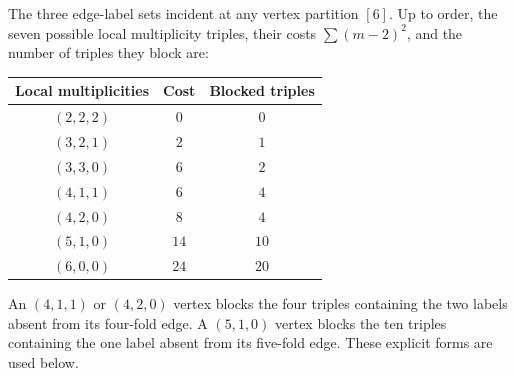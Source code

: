 \documentclass[11pt]{article}
\begin{document}
The three edge-label sets incident at any vertex partition $[6]$. Up to order, the seven possible local multiplicity triples, their costs $\sum(m-2)^2$, and the number of triples they block are:
\begin{center}\begin{tabular}{ccc}\toprule
Local multiplicities&Cost&Blocked triples\\\midrule
$(2,2,2)$&$0$&$0$\\
$(3,2,1)$&$2$&$1$\\
$(3,3,0)$&$6$&$2$\\
$(4,1,1)$&$6$&$4$\\
$(4,2,0)$&$8$&$4$\\
$(5,1,0)$&$14$&$10$\\
$(6,0,0)$&$24$&$20$\\\bottomrule
\end{tabular}\end{center}
An $(4,1,1)$ or $(4,2,0)$ vertex blocks the four triples containing the two labels absent from its four-fold edge. A $(5,1,0)$ vertex blocks the ten triples containing the one label absent from its five-fold edge. These explicit forms are used below.
\end{document}
